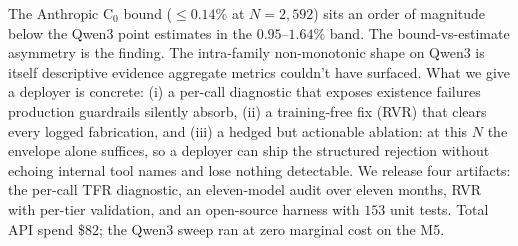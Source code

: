 The Anthropic $\mathrm{C}_0$ bound ($\leq\!0.14\%$ at $N=2{,}592$)
sits an order of magnitude below the Qwen3 point estimates in the
$0.95$--$1.64\%$ band. The bound-vs-estimate asymmetry is the
finding. The intra-family non-monotonic shape on Qwen3 is itself
descriptive evidence aggregate metrics couldn't have surfaced. What we
give a deployer is concrete: (i) a per-call diagnostic that exposes
existence failures production guardrails silently absorb, (ii) a
training-free fix (RVR) that clears every logged fabrication, and (iii)
a hedged but actionable ablation: at this $N$ the envelope alone
suffices, so a deployer can ship the structured rejection without
echoing internal tool names and lose nothing detectable. We release four artifacts: the per-call TFR
diagnostic, an eleven-model audit over eleven months, RVR with per-tier
validation, and an open-source harness with $153$ unit tests. Total API
spend \$$82$; the Qwen3 sweep ran at zero marginal cost on the M5.
